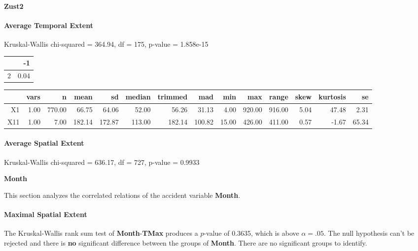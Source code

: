 \Large
\centerline{\textbf{Zust2}}
\normalsize

\paragraph{Average Temporal Extent}
Kruskal-Wallis chi-squared = 364.94, df = 175, p-value = 1.858e-15

% 
\begin{tabular}{rr}
  \hline
 & -1 \\ 
  \hline
2 & 0.04 \\ 
   \hline
\end{tabular}
% 
\begin{tabular}{rrrrrrrrrrrrrr}
  \hline
 & vars & n & mean & sd & median & trimmed & mad & min & max & range & skew & kurtosis & se \\ 
  \hline
X1 & 1.00 & 770.00 & 66.75 & 64.06 & 52.00 & 56.26 & 31.13 & 4.00 & 920.00 & 916.00 & 5.04 & 47.48 & 2.31 \\ 
  X11 & 1.00 & 7.00 & 182.14 & 172.87 & 113.00 & 182.14 & 100.82 & 15.00 & 426.00 & 411.00 & 0.57 & -1.67 & 65.34 \\ 
   \hline
\end{tabular}

\paragraph{Average Spatial Extent}
Kruskal-Wallis chi-squared = 636.17, df = 727, p-value = 0.9933

\Large
\centerline{\textbf{Month}}
\normalsize
This section analyzes the correlated relations of the accident variable \textbf{Month}.

\paragraph{Maximal Spatial Extent}
The Kruskal-Wallis rank sum test of \textbf{Month}-\textbf{TMax} produces a $p$-value of 0.3635, which is above $\alpha=.05$. The null hypothesis can't be rejected and there is \textbf{no} significant difference between the groups of \textbf{Month}. There are no significant groups to identify.

